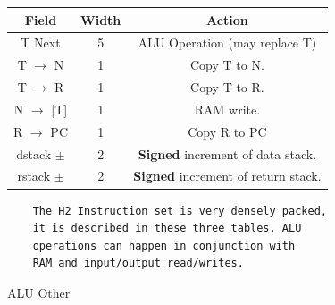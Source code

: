 \documentclass	[a4paper, 10pt]	{article}
\begin{document}
\begin{figure}[ht]
\begin{minipage}[t]{0.45\linewidth}
    \centering

    \begin{tabular}{|c|c|c|}
    \hline
    Field & Width & Action\\
    \hline
    T Next & 5 & ALU Operation (may replace T)\\
    \hline
    T $\to$ N & 1 & Copy T to N. \\
    \hline
    T $\to$ R & 1 & Copy T to R. \\
    \hline
    N $\to$ [T] & 1 & RAM write. \\
    \hline
    R $\to$ PC & 1 & Copy R to PC \\
    \hline
    dstack $\pm$ & 2 & \textbf{Signed} increment of data stack.\\
    \hline
    rstack $\pm$ & 2 & \textbf{Signed} increment of return stack.\\
    \hline

    \end{tabular}
    \caption{ALU Other}
    \label{fig:ALU instructions}

    \vspace{1cm}
\begin{verbatim}
    The H2 Instruction set is very densely packed, 
    it is described in these three tables. ALU
    operations can happen in conjunction with
    RAM and input/output read/writes.
\end{verbatim}
  \vspace{2cm}


\end{minipage}
\end{figure}
\end{document}
